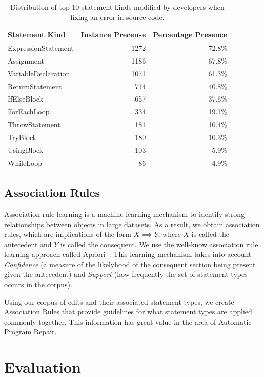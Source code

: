 \documentclass[sigconf]{acmart}
\begin{document}
\begin{table}[]
\centering
\caption{Distribution of top 10 statement kinds modified by 
developers when fixing an error in source code. }
\label{corpusDist}
\begin{tabular}{lrr}
\toprule
Statement Kind      & Instance Precense & Percentage Presence  \\
\midrule
ExpressionStatement & 1272 & 72.8\% \\
Assignment          & 1186 & 67.8\% \\
VariableDeclaration & 1071 & 61.3\% \\
ReturnStatement     & 714  & 40.8\% \\
IfElseBlock         & 657  & 37.6\% \\
ForEachLoop         & 334  & 19.1\% \\
ThrowStatement      & 181  & 10.4\% \\
TryBlock            & 180  & 10.3\% \\
UsingBlock          & 103  & 5.9\%  \\
WhileLoop           & 86   & 4.9\%  \\
\bottomrule
\end{tabular}
\end{table}

\subsection{Association Rules}
\label{assocRules}
Association rule learning is a machine learning mechanism to identify
strong relationships between objects in large datasets. 
As a result, we obtain association rules, which are implications of the
form $X \implies Y$, where $X$ is called the antecedent and 
$Y$ is called the consequent.
We use the well-know association rule learning approach called 
Apriori~\cite{Agrawal94}. This learning mechanism takes into 
account \textit{Confidence} (a measure of the likelyhood 
of the consequent section being present given the 
antecedent) and \textit{Support} (how frequently the set of
statement types occurs in the corpus).

Using our corpus of edits and their associated statement types, 
we create Association Rules that provide guidelines
for what statement types are applied commonly together. This
information has great value in the area of Automatic 
Program Repair.

\section{Evaluation}
\label{eval}
\end{document}
